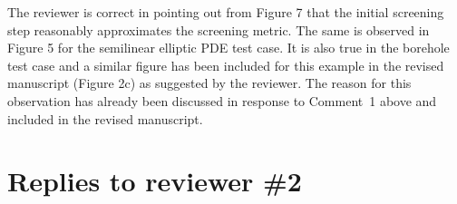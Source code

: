 \documentclass[11pt,final]{article}
\newcommand{\referee}[1]{\vspace{.1ex}\noindent{\textcolor{blue}{#1}}}
\begin{document}
\begin{enumerate}
The reviewer is correct in pointing out from Figure 7 that the initial screening step
reasonably approximates the screening metric. The same is observed in
Figure 5 for the semilinear elliptic PDE test case. It is also true in the borehole test
case and a similar figure has been included for this example in the revised manuscript
(Figure 2c) as suggested by the reviewer. The reason for this observation has already
been discussed in response to Comment~1 above and included in the revised manuscript. 

\end{enumerate}

\section{Replies to reviewer \#2}

\referee{
An adaptive surrogate model construction approach in reduced input parameter
space is proposed in this paper. Instead of variance based sensitivity indices,
derivative based global sensitivity measures are employed to calibration of the
important model inputs, upon which surrogate models are constructed. To
demonstrate the computational advantage, the proposed approach is then
validated against three examples.  The reviewer’s recommendation is ``major
revision''.}
\end{document}
